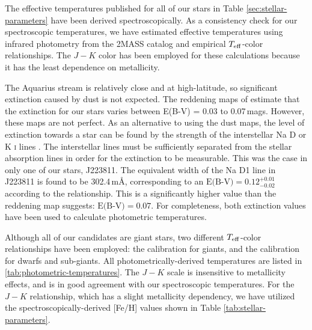\documentclass{emulateapj}
\begin{document}
The effective temperatures published for all of our stars in Table \ref{sec:stellar-parameters} have been derived spectroscopically. As a consistency check for our spectroscopic temperatures, we have estimated effective temperatures using infrared photometry from the 2MASS catalog and empirical $T_{\rm eff}$-color relationships. The $J-K$ color has been employed for these calculations because it has the least dependence on metallicity. 

The Aquarius stream is relatively close and at high-latitude, so significant extinction caused by dust is not expected. The reddening maps of \citet{schlegel;et-al_1998} estimate that the extinction for our stars varies between E(B-V) = 0.03 to 0.07\,mags. However, these maps are not perfect. As an alternative to using the \citet{schlegel;et-al_1998} dust maps, the level of extinction towards a star can be found by the strength of the interstellar Na D or K \textsc{i} lines \citep{munari;zwitter_1997}. The interstellar lines must be sufficiently separated from the stellar absorption lines in order for the extinction to be measurable. This was the case in only one of our stars, J223811. The equivalent width of the Na D1 line in J223811 is found to be 302.4\,m{\AA}, corresponding to an $\mbox{E(B-V)} = 0.12^{+0.01}_{-0.02}$ according to the \citet{munari;zwitter_1997} relationship. This is a significantly higher value than the \citet{schlegel;et-al_1998} reddening map suggests: $\mbox{E(B-V)} = 0.07$. For completeness, both extinction values have been used to calculate photometric temperatures. 

Although all of our candidates are giant stars, two different $T_{\rm eff}$-color relationships have been employed: the \citet{alonso;et-al_1999} calibration for giants, and the \citet{casagrande;et-al_2010} calibration for dwarfs and sub-giants. All photometrically-derived temperatures are listed in \ref{tab:photometric-temperatures}. The \citet{alonso;et-al_1999} $J-K$ scale is insensitive to metallicity effects, and is in good agreement with our spectroscopic temperatures. For the \citet{casagrande;et-al_2010} $J-K$ relationship, which has a slight metallicity dependency, we have utilized the spectroscopically-derived [Fe/H] values shown in Table \ref{tab:stellar-parameters}.
\end{document}
